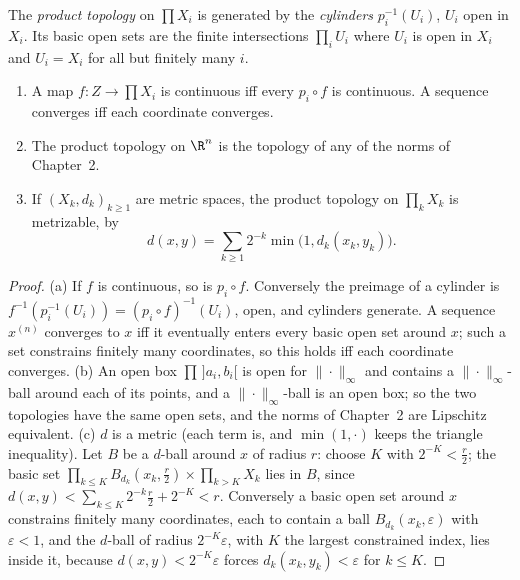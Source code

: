 \begin{definition}
The \emph{product topology} on $\prod X_i$ is generated by the \emph{cylinders} $p_i^{-1}(U_i)$, $U_i$ open in $X_i$. Its basic open sets are the finite
intersections $\prod_iU_i$ where $U_i$ is open in $X_i$ and $U_i=X_i$ for all but finitely many $i$.
\end{definition}

\begin{proposition}\label{prop:product}
\begin{enumerate}[label=(\alph*)]
\item A map $f:Z\to\prod X_i$ is continuous iff every $p_i\circ f$ is continuous. A sequence converges iff each coordinate converges.
\item The product topology on $\R^n$ is the topology of any of the norms of Chapter~2.
\item If $(X_k,d_k)_{k\ge1}$ are metric spaces, the product topology on $\prod_kX_k$ is metrizable, by
\[d(x,y)=\sum_{k\ge1}2^{-k}\min\bigl(1,d_k(x_k,y_k)\bigr).\]
\end{enumerate}
\end{proposition}
\begin{proof}
(a) If $f$ is continuous, so is $p_i\circ f$. Conversely the preimage of a cylinder is $f^{-1}(p_i^{-1}(U_i))=(p_i\circ f)^{-1}(U_i)$, open, and cylinders generate.
A sequence $x^{(n)}$ converges to $x$ iff it eventually enters every basic open set around $x$; such a set constrains finitely many
coordinates, so this holds iff each coordinate converges.
(b) An open box $\prod\,]a_i,b_i[$ is open for $\|\cdot\|_\infty$ and contains a $\|\cdot\|_\infty$-ball around each of its points, and a $\|\cdot\|_\infty$-ball is an open box; so
the two topologies have the same open sets, and the norms of Chapter~2 are Lipschitz equivalent.
(c) $d$ is a metric (each term is, and $\min(1,\cdot)$ keeps the triangle inequality). Let $B$ be a $d$-ball around $x$ of radius $r$: choose $K$ with
$2^{-K}<\frac r2$; the basic set $\prod_{k\le K}B_{d_k}(x_k,\frac r2)\times\prod_{k>K}X_k$ lies in $B$, since $d(x,y)<\sum_{k\le K}2^{-k}\frac r2+2^{-K}<r$. Conversely a basic open set
around $x$ constrains finitely many coordinates, each to contain a ball $B_{d_k}(x_k,\varepsilon)$ with $\varepsilon<1$, and the $d$-ball of radius $2^{-K}\varepsilon$, with
$K$ the largest constrained index, lies inside it, because $d(x,y)<2^{-K}\varepsilon$ forces $d_k(x_k,y_k)<\varepsilon$ for $k\le K$.
\end{proof}

